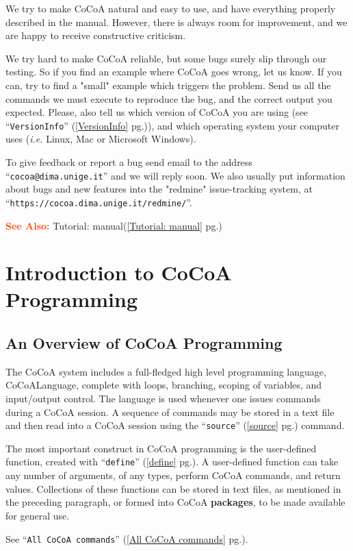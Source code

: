 \documentclass[a4paper]{mybook}
\newcommand\SeeAlso{\par\textcolor{OrangeRed}{\textbf{\large See Also: }}}
\begin{document}
        
We try to make CoCoA natural and easy to use, and have everything
properly described in the manual.  However, there is always room
for improvement, and we are happy to receive constructive criticism.
\par 
We try hard to make CoCoA reliable, but some bugs surely slip through
our testing.
So if you find an example where CoCoA goes wrong, let us know.
If you can, try to find a "small" example which triggers the problem.
Send us all the commands we must execute to reproduce the bug, and the
correct output you expected.
Please, also tell us which version of CoCoA you are using
(see ``\verb&VersionInfo&'' (\ref{VersionInfo} pg.\pageref{VersionInfo})), and which operating system your
computer uses (\textit{i.e.} Linux, Mac or Microsoft Windows).
\par 
To give feedback or report a bug send email to the address
``\verb&cocoa@dima.unige.it&'' and we will reply soon.
We also usually put information about bugs and new features into the
"redmine" issue-tracking system, at ``\verb&https://cocoa.dima.unige.it/redmine/&''.

\SeeAlso %
  Tutorial: manual(\ref{Tutorial: manual} pg.\pageref{Tutorial: manual})

\chapter{Introduction to CoCoA Programming}
\label{Introduction to CoCoA Programming}

      

\section{An Overview of CoCoA Programming}
\label{An Overview of CoCoA Programming}

        
The CoCoA system includes a full-fledged high level programming
language, CoCoALanguage, complete with loops, branching, scoping of
variables, and input/output control.  The language is used whenever
one issues commands during a CoCoA session.  A sequence of commands
may be stored in a text file and then read into a CoCoA session using
the ``\verb&source&'' (\ref{source} pg.\pageref{source}) command.
\par 
The most important construct in CoCoA programming is the user-defined
function, created with ``\verb&define&'' (\ref{define} pg.\pageref{define}).
A user-defined function can take any number of arguments, of any
types, perform CoCoA commands, and return values.
Collections of these functions can be stored in text files,
as mentioned in the preceding paragraph, or formed into CoCoA
\textbf{packages}, to be made available for general use.
\par 
See ``\verb&All CoCoA commands&'' (\ref{All CoCoA commands} pg.\pageref{All CoCoA commands}).
\end{document}
